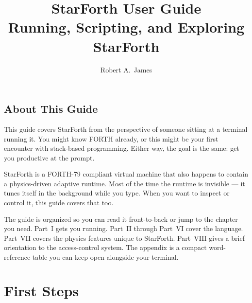 


\usepackage{longtable}
\usepackage{array}

\title{StarForth User Guide\\[0.4em]
       \large Running, Scripting, and Exploring StarForth}
\author{Robert A.\ James}
\date{%
}


\frontmatter
\maketitle

\tableofcontents

\chapter*{About This Guide}

This guide covers StarForth from the perspective of someone sitting at a
terminal running it. You might know FORTH already, or this might be your first
encounter with stack-based programming. Either way, the goal is the same: get
you productive at the prompt.

StarForth is a FORTH-79 compliant virtual machine that also happens to contain
a physics-driven adaptive runtime. Most of the time the runtime is invisible ---
it tunes itself in the background while you type. When you want to inspect or
control it, this guide covers that too.

The guide is organized so you can read it front-to-back or jump to the chapter
you need. Part~I gets you running. Part~II through Part~VI cover the language.
Part~VII covers the physics features unique to StarForth. Part~VIII gives a
brief orientation to the access-control system. The appendix is a compact
word-reference table you can keep open alongside your terminal.

\mainmatter

\part{First Steps}

